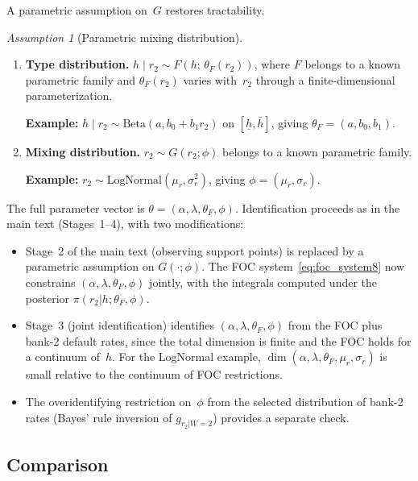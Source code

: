 \documentclass[12pt]{article}
\theoremstyle{plain}
\theoremstyle{plain}
\theoremstyle{definition}
\theoremstyle{remark}
\newtheorem{ass}[thm]{Assumption}
\begin{document}
A parametric assumption on~$G$ restores tractability.

\begin{ass}[Parametric mixing distribution]\label{ass:parametric_continuous}
\begin{enumerate}
    \item[(i)] \textbf{Type distribution.} $h \mid r_2 \sim F(h;\, \theta_F(r_2))$, where $F$ belongs to a known parametric family and $\theta_F(r_2)$ varies with~$r_2$ through a finite-dimensional parameterization.

    \textbf{Example:} $h \mid r_2 \sim \text{Beta}(a, b_0 + b_1 r_2)$ on $[\underline{h}, \bar{h}]$, giving $\theta_F = (a, b_0, b_1)$.

    \item[(ii)] \textbf{Mixing distribution.} $r_2 \sim G(r_2; \phi)$ belongs to a known parametric family.

    \textbf{Example:} $r_2 \sim \text{LogNormal}(\mu_r, \sigma_r^2)$, giving $\phi = (\mu_r, \sigma_r)$.
\end{enumerate}
\end{ass}

The full parameter vector is $\theta = (\alpha, \lambda, \theta_F, \phi)$.  Identification proceeds as in the main text (Stages~1--4), with two modifications:
\begin{itemize}
    \item Stage~2 of the main text (observing support points) is replaced by a parametric assumption on $G(\cdot; \phi)$.  The FOC system~\eqref{eq:foc_system8} now constrains $(\alpha, \lambda, \theta_F, \phi)$ jointly, with the integrals computed under the posterior $\pi(r_2|h;\theta_F,\phi)$.
    \item Stage~3 (joint identification) identifies $(\alpha, \lambda, \theta_F, \phi)$ from the FOC plus bank-2 default rates, since the total dimension is finite and the FOC holds for a continuum of~$h$.  For the LogNormal example, $\dim(\alpha, \lambda, \theta_F, \mu_r, \sigma_r)$ is small relative to the continuum of FOC restrictions.
    \item The overidentifying restriction on~$\phi$ from the selected distribution of bank-2 rates (Bayes' rule inversion of $g_{r_2|W=2}$) provides a separate check.
\end{itemize}

\subsection{Comparison}
\end{document}
